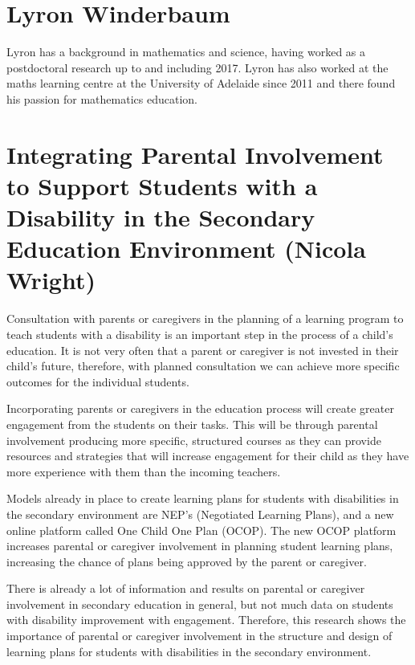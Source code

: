 \documentclass[twoside,12pt,a4paper,notitlepage]{memoir}
\begin{document}
\section*{Lyron Winderbaum}

Lyron has a background in mathematics and science, having worked as a postdoctoral research up to and including 2017. Lyron has also worked at the maths learning centre at the University of Adelaide since 2011 and there found his passion for mathematics education.


\pagebreak
\section*{Integrating Parental Involvement to Support Students with a Disability in the Secondary Education Environment (Nicola Wright)}
\label{aut:wright}

Consultation with parents or caregivers in the planning of a learning program to teach students with a disability is an important step in the process of a child’s education. It is not very often that a parent or caregiver is not invested in their child’s future, therefore, with planned consultation we can achieve more specific outcomes for the individual students.

Incorporating parents or caregivers in the education process will create greater engagement from the students on their tasks. This will be through parental involvement producing more specific, structured courses as they can provide resources and strategies that will increase engagement for their child as they have more experience with them than the incoming teachers.

Models already in place to create learning plans for students with disabilities in the secondary environment are NEP’s (Negotiated Learning Plans), and a new online platform called One Child One Plan (OCOP). The new OCOP platform increases parental or caregiver involvement in planning student learning plans, increasing the chance of plans being approved by the parent or caregiver.

There is already a lot of information and results on parental or caregiver involvement in secondary education in general, but not much data on students with disability improvement with engagement. Therefore, this research shows the importance of parental or caregiver involvement in the structure and design of learning plans for students with disabilities in the secondary environment.
\end{document}

